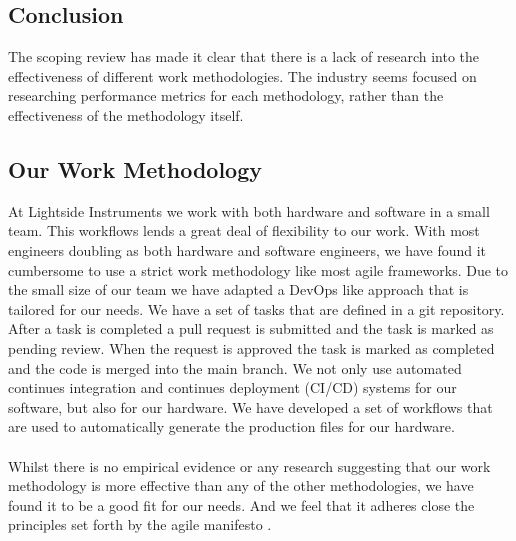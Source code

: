 \documentclass[12pt]{article}
\begin{document}
\subsection{Conclusion}
The scoping review has made it clear that there is a lack of research into the effectiveness of different work methodologies.
The industry seems focused on researching performance metrics for each methodology, rather than the 
effectiveness of the methodology itself.

\subsection{Our Work Methodology}
At Lightside Instruments we work with both hardware and software in a small team. 
This workflows lends a great deal of flexibility to our work.
With most engineers doubling as both hardware and software engineers, we have found it cumbersome to use a strict work methodology like most agile frameworks.
Due to the small size of our team we have adapted a DevOps like approach that is tailored for our needs. 
We have a set of tasks that are defined in a git repository. After a task is completed a pull request is submitted and the task
is marked as pending review. When the request is approved the task is marked as completed and the code is merged into the main branch.
We not only use automated continues integration and continues deployment (CI/CD) systems for our software, but also for our hardware.
We have developed a set of workflows that are used to automatically generate the production files for our hardware. 
\\
\\
Whilst there is no empirical evidence or any research suggesting that our work methodology is more effective than any of the other methodologies, 
we have found it to be a good fit for our needs. And we feel that it adheres close the principles set forth by the agile manifesto 
\cite{ManifestoAgileSoftware}.
\end{document}
